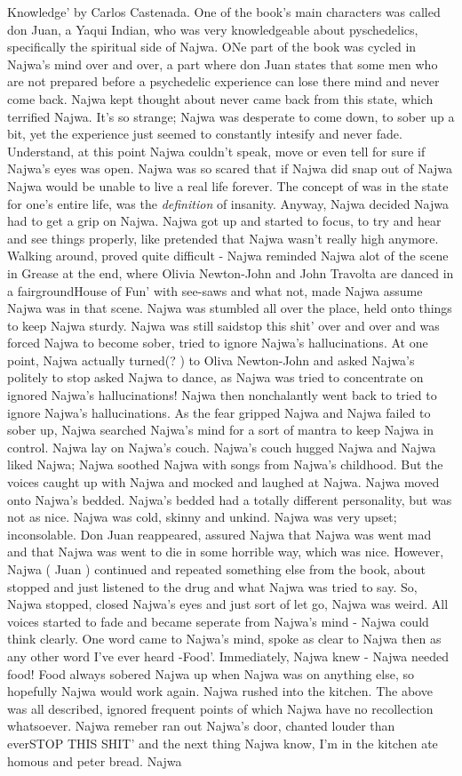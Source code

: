 \documentclass[12pt]{book}
\begin{document}
Knowledge' by Carlos Castenada. One of the book's main characters was called don Juan, a Yaqui Indian, who was very knowledgeable about pyschedelics, specifically the spiritual side of Najwa. ONe part of the book was cycled in Najwa's mind over and over, a part where don Juan states that some men who are not prepared before a psychedelic experience can lose there mind and never come back. Najwa kept thought about never came back from this state, which terrified Najwa. It's so strange; Najwa was desperate to come down, to sober up a bit, yet the experience just seemed to constantly intesify and never fade. Understand, at this point Najwa couldn't speak, move or even tell for sure if Najwa's eyes was open. Najwa was so scared that if Najwa did snap out of Najwa Najwa would be unable to live a real life forever. The concept of was in the state for one's entire life, was the \emph{definition} of insanity. Anyway, Najwa decided Najwa had to get a grip on Najwa. Najwa got up and started to focus, to try and hear and see things properly, like pretended that Najwa wasn't really high anymore. Walking around, proved quite difficult - Najwa reminded Najwa alot of the scene in Grease at the end, where Olivia Newton-John and John Travolta are danced in a fairgroundHouse of Fun' with see-saws and what not, made Najwa assume Najwa was in that scene. Najwa was stumbled all over the place, held onto things to keep Najwa sturdy. Najwa was still saidstop this shit' over and over and was forced Najwa to become sober, tried to ignore Najwa's hallucinations. At one point, Najwa actually turned(? ) to Oliva Newton-John and asked Najwa's politely to stop asked Najwa to dance, as Najwa was tried to concentrate on ignored Najwa's hallucinations! Najwa then nonchalantly went back to tried to ignore Najwa's hallucinations. As the fear gripped Najwa and Najwa failed to sober up, Najwa searched Najwa's mind for a sort of mantra to keep Najwa in control. Najwa lay on Najwa's couch. Najwa's couch hugged Najwa and Najwa liked Najwa; Najwa soothed Najwa with songs from Najwa's childhood. But the voices caught up with Najwa and mocked and laughed at Najwa. Najwa moved onto Najwa's bedded. Najwa's bedded had a totally different personality, but was not as nice. Najwa was cold, skinny and unkind. Najwa was very upset; inconsolable. Don Juan reappeared, assured Najwa that Najwa was went mad and that Najwa was went to die in some horrible way, which was nice. However, Najwa ( Juan ) continued and repeated something else from the book, about stopped and just listened to the drug and what Najwa was tried to say. So, Najwa stopped, closed Najwa's eyes and just sort of let go, Najwa was weird. All voices started to fade and became seperate from Najwa's mind - Najwa could think clearly. One word came to Najwa's mind, spoke as clear to Najwa then as any other word I've ever heard -Food'. Immediately, Najwa knew - Najwa needed food! Food always sobered Najwa up when Najwa was on anything else, so hopefully Najwa would work again. Najwa rushed into the kitchen. The above was all described, ignored frequent points of which Najwa have no recollection whatsoever. Najwa remeber ran out Najwa's door, chanted louder than everSTOP THIS SHIT' and the next thing Najwa know, I'm in the kitchen ate homous and peter bread. Najwa 
\end{document}
